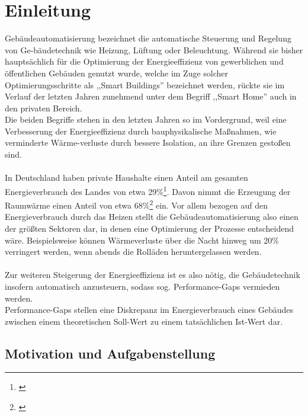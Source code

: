 \clearpage
\chapter{\textbf{Einleitung}}\label{einleitung}



Gebäudeautomatisierung bezeichnet die automatische Steuerung und Regelung von Ge-bäudetechnik 
wie Heizung, Lüftung oder Beleuchtung. Während sie bisher hauptsächlich für die Optimierung 
der Energieeffizienz von gewerblichen und öffentlichen Gebäuden genutzt wurde, welche im 
Zuge solcher Optimierungsschritte als ,,Smart Buildings'' bezeichnet werden, 
rückte sie im Verlauf der letzten Jahren zunehmend unter dem Begriff ,,Smart Home'' auch in den privaten 
Bereich.\\
Die beiden Begriffe stehen in den letzten Jahren so im Vordergrund, weil eine
Verbesserung der Energieeffizienz durch bauphysikalische Maßnahmen, wie verminderte 
Wärme-verluste durch bessere Isolation, an ihre Grenzen gestoßen sind.\\\\
In Deutschland haben private Haushalte einen Anteil am gesamten Energieverbrauch des Landes von 
etwa 29\%\footnote[1]{\cite{Umweltbundesamt1}}. Davon nimmt die Erzeugung der Raumwärme einen Anteil
von etwa 68\%\footnote[2]{\cite{Umweltbundesamt}} ein. Vor allem bezogen
auf den Energieverbrauch durch das Heizen stellt die Gebäudeautomatisierung also einen der größten
Sektoren dar, in denen eine Optimierung der Prozesse entscheidend wäre. Beispielsweise können Wärmeverluste
über die Nacht hinweg um 20\% verringert werden, wenn abends die Rolläden heruntergelassen werden.\\\\
Zur weiteren Steigerung der Energieeffizienz ist es also nötig, die Gebäudetechnik insofern
automatisch anzusteuern, sodass sog. Performance-Gaps vermieden werden.\\
Performance-Gaps stellen eine Diskrepanz im Energieverbrauch eines Gebäudes zwischen einem theoretischen 
Soll-Wert zu einem tatsächlichen Ist-Wert dar.\\


\section{Motivation und Aufgabenstellung}

